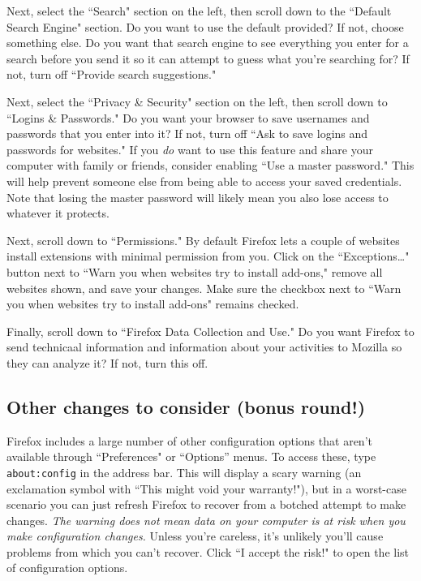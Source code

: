 \documentclass[fontsize=11pt]{article}
\begin{document}
Next, select the ``Search" section on the left, then scroll down to the ``Default Search Engine" section.  Do you want to use the default provided?  If not, choose something else.  Do you want that search engine to see everything you enter for a search before you send it so it can attempt to guess what you're searching for?  If not, turn off ``Provide search suggestions."

Next, select the ``Privacy \& Security" section on the left, then scroll down to ``Logins \& Passwords."  Do you want your browser to save usernames and passwords that you enter into it?  If not, turn off ``Ask to save logins and passwords for websites."  If you \emph{do} want to use this feature and share your computer with family or friends, consider enabling ``Use a master password."  This will help prevent someone else from being able to access your saved credentials.  Note that losing the master password will likely mean you also lose access to whatever it protects.

Next, scroll down to ``Permissions."  By default Firefox lets a couple of websites install extensions with minimal permission from you.  Click on the ``Exceptions\ldots{}" button next to ``Warn you when websites try to install add-ons," remove all websites shown, and save your changes.  Make sure the checkbox next to ``Warn you when websites try to install add-ons" remains checked.

Finally, scroll down to ``Firefox Data Collection and Use."  Do you want Firefox to send technicaal information and information about your activities to Mozilla so they can analyze it?  If not, turn this off.



\subsection*{Other changes to consider (bonus round!)}
Firefox includes a large number of other configuration options that aren't available through ``Preferences" or ``Options'' menus.  To access these, type \texttt{about:config} in the address bar.  This will display a scary warning (an exclamation symbol with ``This might void your warranty!"), but in a worst-case scenario you can just refresh Firefox to recover from a botched attempt to make changes.  \emph{The warning does not mean data on your computer is at risk when you make configuration changes.}  Unless you're careless, it's unlikely you'll cause problems from which you can't recover.  Click ``I accept the risk!" to open the list of configuration options.
\end{document}
